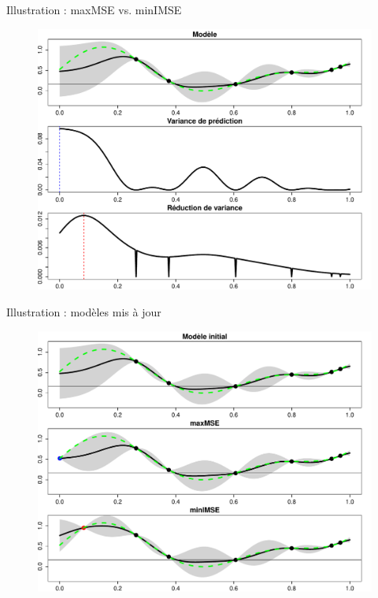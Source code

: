 \begin{frame}{Illustration : maxMSE vs. minIMSE}
\begin{figure}
	\includegraphics[width=.9\textwidth]{autres/maxMSEvsIMSE.pdf}
\end{figure}
\end{frame}
\begin{frame}{Illustration : modèles mis à jour}
\begin{figure}
	\includegraphics[width=.9\textwidth]{autres/maxMSEvsIMSE2.pdf}
\end{figure}
\end{frame}
